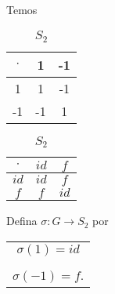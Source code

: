 \documentclass{beamer}
\begin{document}
    \begin{frame}
        Temos \pause
        \begin{table}
            \begin{minipage}{.5\linewidth}
                \caption*{$G$}
                \centering
                \begin{tabular}{|c|c|c|}
                    \hline
                    $\cdot$ & 1 & -1\\
                    \hline
                    1 & 1 & -1\\
                    \hline
                    -1 & -1 & 1\\
                    \hline
                \end{tabular}
            \end{minipage}%
            \pause
            \begin{minipage}{.5\linewidth}
                \caption*{$S_2$}
                \centering
                \begin{tabular}{|c|c|c|}
                    \hline
                    $\cdot$ & $id$ & $f$\\
                    \hline
                    $id$ & $id$ & $f$\\
                    \hline
                    $f$ & $f$ & $id$\\
                    \hline
                \end{tabular}
            \end{minipage}\pause
        \end{table}

        \vspace{.4cm}

        Defina $\sigma : G \to S_2$ por \pause
        \begin{center}
            \begin{tabular}{c}
                $\sigma(1) = id$ \pause\\
                \vspace{.3cm}\\
                $\sigma(-1) = f$.
            \end{tabular}
        \end{center}
    \end{frame}
\end{document}
